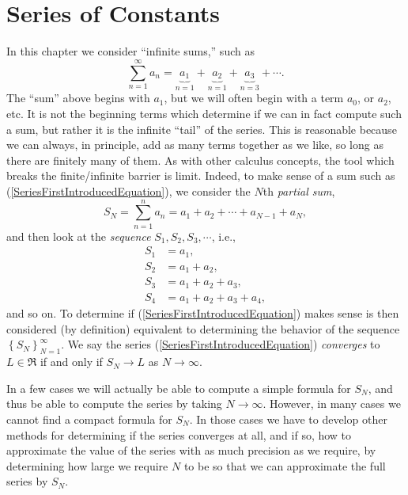 \chapter{Series of Constants\label{FirstSeriesChapter}}
In this chapter we consider ``infinite sums,'' such as
\begin{equation}
\sum_{n=1}^\infty a_n=\underbrace{a_1}_{n=1}+\underbrace{a_2}_{n=1}
  +\underbrace{a_3}_{n=3}+\cdots.
\label{SeriesFirstIntroducedEquation}\end{equation}
The ``sum'' above begins with $a_1$, but we will often begin
with a term $a_0$, or $a_2$, etc.  It is not the beginning
terms which determine if we can in fact compute such a
sum, but rather it is the infinite ``tail'' of the series.
This is reasonable because we can always, in principle, 
add as many terms together as we like, so long as there are
finitely many of them.  As with other calculus concepts,
the tool which breaks the finite/infinite barrier is limit.
Indeed, to make sense of a sum such as (\ref{SeriesFirstIntroducedEquation}),
we consider the $N$th {\it partial sum},
\begin{equation}
S_N=\sum_{n=1}^na_n=a_1+a_2+\cdots+a_{N-1}+a_N,
\label{PartialSumFirstIntroducedEquation}\end{equation}
and then look at the {\it sequence} $S_1,S_2,S_3,\cdots$,
i.e.,
\begin{align*}
S_1&=a_1,\\
S_2&=a_1+a_2,\\
S_3&=a_1+a_2+a_3,\\
S_4&=a_1+a_2+a_3+a_4,\end{align*}
and so on.  To determine if (\ref{SeriesFirstIntroducedEquation})
makes sense is then considered (by definition) equivalent
to determining the behavior of the sequence $\left\{S_N\right\}_{N=1}^\infty$.
We say the series (\ref{SeriesFirstIntroducedEquation})
{\it converges} to $L\in\Re$ if and only if $S_N\longrightarrow L$
as $N\to\infty$.

In a few cases we will actually be able to compute a simple
formula for $S_N$, and thus be able to compute the 
series by taking $N\to\infty$.  However, in many cases
we cannot find a compact formula for $S_N$.  In those cases
we have to develop other methods for determining if
the series converges at all, and if so, how to approximate
the value of the series with as much precision as we require,
by determining how large we require $N$ to be so that
we can approximate the full series by $S_N$.

